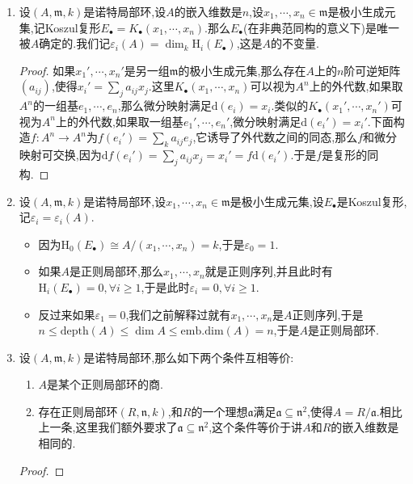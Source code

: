 \begin{enumerate}
	\item 设$(A,\mathfrak{m},k)$是诺特局部环,设$A$的嵌入维数是$n$,设$x_1,\cdots,x_n\in\mathfrak{m}$是极小生成元集,记Koszul复形$E_{\bullet}=K_{\bullet}(x_1,\cdots,x_n)$.那么$E_{\bullet}$(在非典范同构的意义下)是唯一被$A$确定的.我们记$\varepsilon_i(A)=\dim_k\mathrm{H}_i(E_{\bullet})$,这是$A$的不变量.
	\begin{proof}
		
		如果$x_1',\cdots,x_n'$是另一组$\mathfrak{m}$的极小生成元集,那么存在$A$上的$n$阶可逆矩阵$\left(a_{ij}\right)$,使得$x_i'=\sum_ja_{ij}x_j$.这里$K_{\bullet}(x_1,\cdots,x_n)$可以视为$A^n$上的外代数,如果取$A^n$的一组基$e_1,\cdots,e_n$,那么微分映射满足$\mathrm{d}(e_i)=x_i$.类似的$K_{\bullet}(x_1',\cdots,x_n')$可视为$A^n$上的外代数,如果取一组基$e_1',\cdots,e_n'$,微分映射满足$\mathrm{d}(e_i')=x_i'$.下面构造$f:A^n\to A^n$为$f(e_i')=\sum_ka_{ij}e_j$,它诱导了外代数之间的同态,那么$f$和微分映射可交换,因为$\mathrm{d}f(e_i')=\sum_ja_{ij}x_j=x_i'=f\mathrm{d}(e_i')$.于是$f$是复形的同构.
	\end{proof}
	\item 设$(A,\mathfrak{m},k)$是诺特局部环,设$x_1,\cdots,x_n\in\mathfrak{m}$是极小生成元集,设$E_{\bullet}$是Koszul复形,记$\varepsilon_i=\varepsilon_i(A)$.
	\begin{itemize}
		\item 因为$\mathrm{H}_0(E_{\bullet})\cong A/(x_1,\cdots,x_n)=k$,于是$\varepsilon_0=1$.
		\item 如果$A$是正则局部环,那么$x_1,\cdots,x_n$就是正则序列,并且此时有$\mathrm{H}_i(E_{\bullet})=0,\forall i\ge1$,于是此时$\varepsilon_i=0,\forall i\ge1$.
		\item 反过来如果$\varepsilon_1=0$,我们之前解释过就有$x_1,\cdots,x_n$是$A$正则序列,于是$n\le\mathrm{depth}(A)\le\dim A\le\mathrm{emb.dim}(A)=n$,于是$A$是正则局部环.
	\end{itemize}
	\item 设$(A,\mathfrak{m},k)$是诺特局部环,那么如下两个条件互相等价:
	\begin{enumerate}
		\item $A$是某个正则局部环的商.
		\item 存在正则局部环$(R,\mathfrak{n},k)$,和$R$的一个理想$\mathfrak{a}$满足$\mathfrak{a}\subseteq\mathfrak{n}^2$,使得$A=R/\mathfrak{a}$.相比上一条,这里我们额外要求了$\mathfrak{a}\subseteq\mathfrak{n}^2$,这个条件等价于讲$A$和$R$的嵌入维数是相同的.
	\end{enumerate}
    \begin{proof}
    	

\end{proof}
\end{enumerate}
